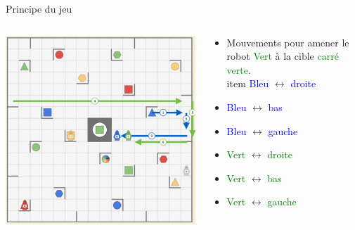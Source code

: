 \documentclass{beamer}
\begin{document}
\begin{frame}{Principe du jeu}
    \begin{columns}
        \begin{column}{0.6\textwidth}
        \vspace{\topsep}
        \includegraphics[scale=0.4]{Images/r8.png}%
        \end{column}
        
        \begin{column}{0.4\textwidth}
        \begin{itemize}
        \item Mouvements pour amener le robot \textcolor{green}{Vert} à la cible \textcolor{green}{carré verte}.
        \\item \textcolor{blue}{Bleu} $\longleftrightarrow$ \textcolor{blue}{droite}
        \item \textcolor{blue}{Bleu} $\longleftrightarrow$ \textcolor{blue}{bas}
        \item \textcolor{blue}{Bleu} $\longleftrightarrow$ \textcolor{blue}{gauche}
        \item \textcolor{green}{Vert} $\longleftrightarrow$ \textcolor{green}{droite}
        \item \textcolor{green}{Vert} $\longleftrightarrow$ \textcolor{green}{bas}
        \item \textcolor{green}{Vert} $\longleftrightarrow$ \textcolor{green}{gauche}
        \end{itemize}
        \end{column}
    \end{columns}
\end{frame}
\end{document}

